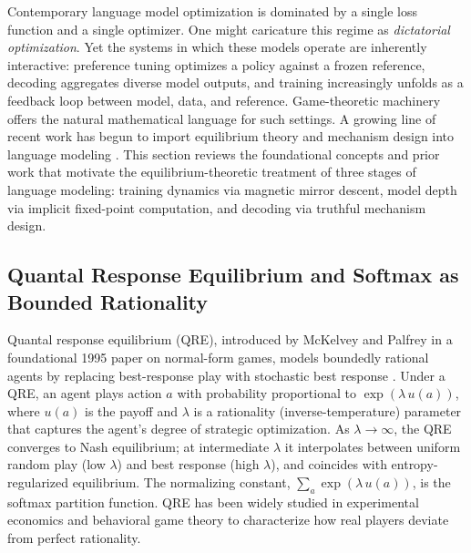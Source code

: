 
Contemporary language model optimization is dominated by a single loss function and a single optimizer.
One might caricature this regime as \emph{dictatorial optimization}.
Yet the systems in which these models operate are inherently interactive: preference tuning optimizes
a policy against a frozen reference, decoding aggregates diverse model outputs, and training increasingly
unfolds as a feedback loop between model, data, and reference.
Game-theoretic machinery offers the natural mathematical language for such settings.
A growing line of recent work has begun to import equilibrium theory and mechanism design into language modeling
\citep{Sokota2023, Bai2019, Duetting2024, Wu2024}.
This section reviews the foundational concepts and prior work that motivate the equilibrium-theoretic treatment
of three stages of language modeling: training dynamics via magnetic mirror descent, model depth via implicit
fixed-point computation, and decoding via truthful mechanism design.

\subsection{Quantal Response Equilibrium and Softmax as Bounded Rationality}

Quantal response equilibrium (QRE), introduced by McKelvey and Palfrey in a foundational 1995 paper on
normal-form games, models boundedly rational agents by replacing best-response play with stochastic best
response \citep{McKelvey1995}.
Under a QRE, an agent plays action $a$ with probability proportional to $\exp(\lambda\, u(a))$,
where $u(a)$ is the payoff and $\lambda$ is a rationality (inverse-temperature) parameter that captures
the agent's degree of strategic optimization.
As $\lambda \to \infty$, the QRE converges to Nash equilibrium; at intermediate $\lambda$ it interpolates
between uniform random play (low $\lambda$) and best response (high $\lambda$), and coincides with
entropy-regularized equilibrium.
The normalizing constant, $\sum_a \exp(\lambda\, u(a))$, is the softmax partition function.
QRE has been widely studied in experimental economics and behavioral game theory to characterize how real
players deviate from perfect rationality.


